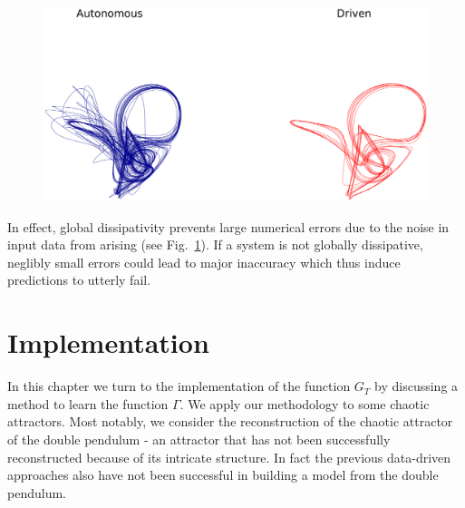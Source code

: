 \documentclass[a4paper,12pt,twoside]{report}
\begin{document}
\begin{figure}[ht]
  \includegraphics[scale=0.25]{_autovsdriven.eps}
  \centering
  \label{fig:learningFailure}
\end{figure}

In effect, global dissipativity prevents large numerical errors due to the noise in input data from arising (see Fig.~\ref{fig:learningFailure}). 
If a system is not globally dissipative, neglibly small errors could lead to major inaccuracy which thus induce predictions to utterly fail.



\chapter{Implementation} \label{ch5}

In this chapter we turn to the implementation of the function $G_T$ by discussing a method to learn the function $\Gamma$. We apply our methodology to some chaotic attractors. Most notably, we consider the reconstruction of the chaotic attractor of the double pendulum - an  attractor that has not been successfully reconstructed because of its intricate structure. In fact the previous data-driven approaches also have not been successful in building a model from the double pendulum. 



\end{document}
